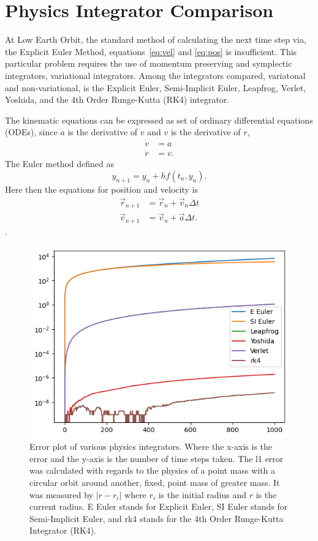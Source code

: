\documentclass{article}
\begin{document}
\section{Physics Integrator Comparison}

At Low Earth Orbit, the standard method of calculating the next time step via, the Explicit Euler Method, equations~\ref{eq:vel} and \ref{eq:pos} is insufficient. This particular problem requires the use of momentum preserving and symplectic integrators, variational integrators. Among the integrators compared, variatonal and non-variational, is the Explicit Euler, Semi-Implicit Euler, Leapfrog, Verlet, Yoshida, and the 4th Order Runge-Kutta (RK4) integrator.

The kinematic equations can be expressed as set of ordinary differential equations (ODEs), since $a$ is the derivative of $v$ and $v$ is the derivative of $r$,
\begin{align*}
\dot{v}&=a\\
\dot{r}&=v.
\end{align*} The Euler method defined as $$y_{n+1}=y_n+hf(t_n, y_n).$$ Here then the equations for position and velocity is 
\begin{align*}
\vec{r}_{n+1}&=\vec{r}_n+\vec{v}_n \Delta t\\
\vec{v}_{n+1}&=\vec{v}_n+\vec{a} \Delta t.
\end{align*}. 

\begin{figure}
\centering
\includegraphics[scale=0.75]{Integration_comparison}
\caption{Error plot of various physics integrators. Where the x-axis is the error and the y-axis is the number of time steps taken. The l1 error was calculated with regards to the physics of a point mass with a circular orbit around another, fixed, point mass of greater mass. It was measured by $|r-r_i|$ where $r_i$ is the initial radius and $r$ is the current radius. E Euler stands for Explicit Euler, SI Euler stands for Semi-Implicit Euler, and rk4 stands for the 4th Order Runge-Kutta Integrator (RK4).}
\end{figure}

\newpage



\end{document}
